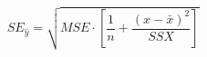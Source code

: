 \documentclass[10pt]{article}
\begin{document}
\[SE_{\hat{y}} = \sqrt{MSE\cdot \left[ \frac{1}{n} + \frac{(x-\bar{x})^2} {SSX} \right]}\]
\end{document}
